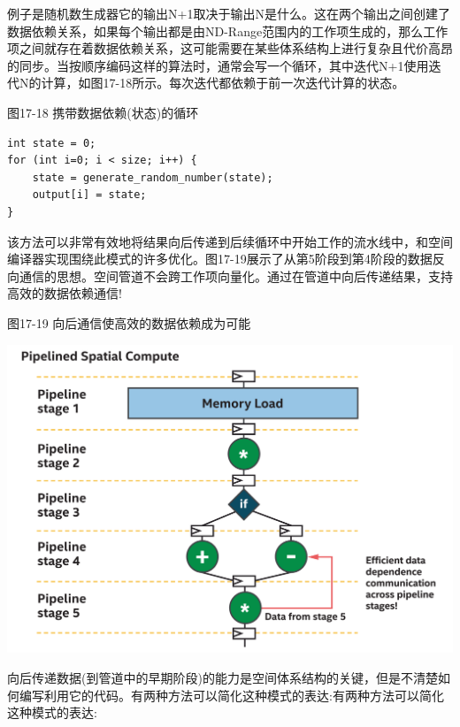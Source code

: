 例子是随机数生成器它的输出N+1取决于输出N是什么。这在两个输出之间创建了数据依赖关系，如果每个输出都是由ND-Range范围内的工作项生成的，那么工作项之间就存在着数据依赖关系，这可能需要在某些体系结构上进行复杂且代价高昂的同步。当按顺序编码这样的算法时，通常会写一个循环，其中迭代N+1使用迭代N的计算，如图17-18所示。每次迭代都依赖于前一次迭代计算的状态。\par

\hspace*{\fill} \par %
图17-18 携带数据依赖(状态)的循环
\begin{lstlisting}[caption={}]
int state = 0;
for (int i=0; i < size; i++) {
	state = generate_random_number(state);
	output[i] = state;
}
\end{lstlisting}

该方法可以非常有效地将结果向后传递到后续循环中开始工作的流水线中，和空间编译器实现围绕此模式的许多优化。图17-19展示了从第5阶段到第4阶段的数据反向通信的思想。空间管道不会跨工作项向量化。通过在管道中向后传递结果，支持高效的数据依赖通信!\par

\hspace*{\fill} \par %
图17-19 向后通信使高效的数据依赖成为可能
\begin{center}
	\includegraphics[width=1.0\textwidth]{content/chapter-17/images/16}
\end{center}

向后传递数据(到管道中的早期阶段)的能力是空间体系结构的关键，但是不清楚如何编写利用它的代码。有两种方法可以简化这种模式的表达:有两种方法可以简化这种模式的表达:\par

